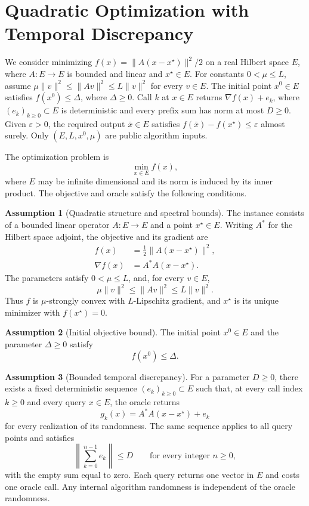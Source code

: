 \documentclass[10pt]{article}
\theoremstyle{definition}
\newtheorem{assumption}{Assumption}
\begin{document}
\section*{Quadratic Optimization with Temporal Discrepancy}
We consider minimizing $f(x)=\|A(x-x^\star)\|^2/2$ on a real Hilbert space $E$, where $A:E\to E$ is bounded and linear and $x^\star\in E$. For constants $0<\mu\leq L$, assume $\mu\|v\|^2\leq\|Av\|^2\leq L\|v\|^2$ for every $v\in E$. The initial point $x^0\in E$ satisfies $f(x^0)\leq\Delta$, where $\Delta\geq0$. Call $k$ at $x\in E$ returns $\nabla f(x)+e_k$, where $(e_k)_{k\geq0}\subset E$ is deterministic and every prefix sum has norm at most $D\geq0$. Given $\varepsilon>0$, the required output $\bar{x}\in E$ satisfies $f(\bar{x})-f(x^\star)\leq\varepsilon$ almost surely. Only $(E,L,x^0,\mu)$ are public algorithm inputs.

The optimization problem is
\[
\min_{x\in E} f(x),
\]
where $E$ may be infinite dimensional and its norm is induced by its inner product. The objective and oracle satisfy the following conditions.

\begin{assumption}[Quadratic structure and spectral bounds]
The instance consists of a bounded linear operator $A:E\to E$ and a point $x^\star\in E$. Writing $A^*$ for the Hilbert space adjoint, the objective and its gradient are
\[
\begin{aligned}
f(x)&=\frac12\|A(x-x^\star)\|^2,\\
\nabla f(x)&=A^*A(x-x^\star).
\end{aligned}
\]
The parameters satisfy $0<\mu\leq L$, and, for every $v\in E$,
\[
\mu\|v\|^2\leq\|Av\|^2\leq L\|v\|^2.
\]
Thus $f$ is $\mu$-strongly convex with $L$-Lipschitz gradient, and $x^\star$ is its unique minimizer with $f(x^\star)=0$.
\end{assumption}

\begin{assumption}[Initial objective bound]
The initial point $x^0\in E$ and the parameter $\Delta\geq0$ satisfy
\[
f(x^0)\leq\Delta.
\]
\end{assumption}

\begin{assumption}[Bounded temporal discrepancy]
For a parameter $D\geq0$, there exists a fixed deterministic sequence $(e_k)_{k\geq0}\subset E$ such that, at every call index $k\geq0$ and every query $x\in E$, the oracle returns
\[
g_k(x)=A^*A(x-x^\star)+e_k
\]
for every realization of its randomness. The same sequence applies to all query points and satisfies
\[
\left\|\sum_{k=0}^{n-1}e_k\right\|\leq D
\qquad\text{for every integer }n\geq0,
\]
with the empty sum equal to zero. Each query returns one vector in $E$ and costs one oracle call. Any internal algorithm randomness is independent of the oracle randomness.
\end{assumption}
\end{document}
